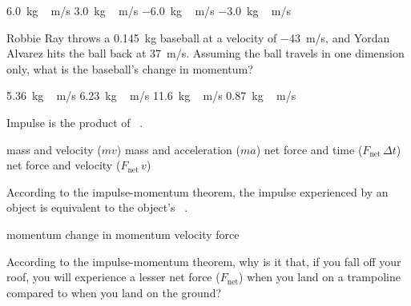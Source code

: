 \documentclass{exam}
\begin{document}
\begin{questions}
\begin{randomizechoices}
\choice \SI{6.0}{kg\,m/s}
\choice \SI{3.0}{kg\,m/s}
\correctchoice \SI{-6.0}{kg\,m/s}
\choice \SI{-3.0}{kg\,m/s}
\end{randomizechoices}

\question
Robbie Ray throws a \SI{0.145}{kg} baseball at a velocity of \SI{-43}{m/s}, and Yordan Alvarez hits the ball back at \SI{37}{m/s}. Assuming the ball travels in one dimension only, what is the baseball's change in momentum?

\begin{randomizechoices}
\choice \SI{5.36}{kg\,m/s}
\choice \SI{6.23}{kg\,m/s}
\correctchoice \SI{11.6}{kg\,m/s}
\choice \SI{0.87}{kg\,m/s}
\end{randomizechoices}

\question
Impulse is the product of \fillin\ .

\begin{randomizechoices}
\choice mass and velocity ($mv$)
\choice mass and acceleration ($ma$)
\correctchoice net force and time ($F_{\text{net}}\,\Delta t$)
\choice net force and velocity ($F_{\text{net}}\,v$)
\end{randomizechoices}

\question
According to the impulse-momentum theorem, the impulse experienced by an object is equivalent to the object's \fillin\ .

\begin{randomizechoices}
\choice momentum
\correctchoice change in momentum
\choice velocity
\choice force
\end{randomizechoices}





\question
According to the impulse-momentum theorem, why is it that, if you fall off your roof, you will experience a lesser net force ($F_{\text{net}}$) when you land on a trampoline compared to when you land on the ground?


\end{questions}
\end{document}
